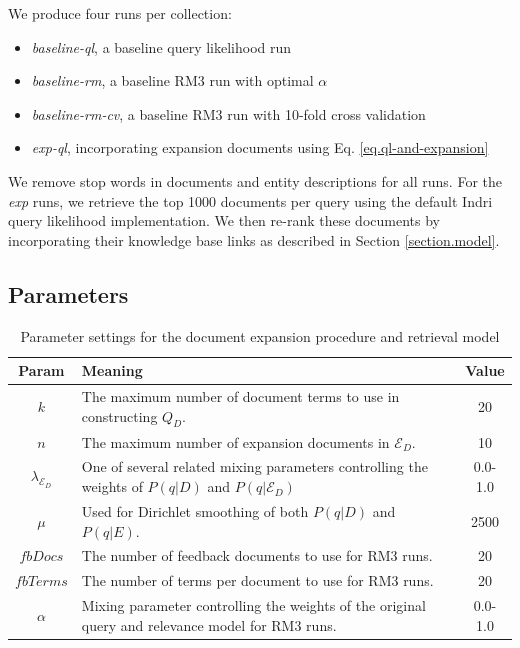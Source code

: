 \documentclass{article}
\begin{document}
We produce four runs per collection:
\begin{itemize}
	\item \textit{baseline-ql}, a baseline query likelihood run
	\item \textit{baseline-rm}, a baseline RM3 run with optimal $\alpha$
	\item \textit{baseline-rm-cv}, a baseline RM3 run with 10-fold cross validation
	\item \textit{exp-ql}, incorporating expansion documents using Eq. \ref{eq.ql-and-expansion}
\end{itemize}

We remove stop words in documents and entity descriptions for all runs. For the \textit{exp} runs, we retrieve the top 1000 documents per query using the default Indri query likelihood implementation. We then re-rank these documents by incorporating their knowledge base links as described in Section \ref{section.model}.

\subsection{Parameters}\label{section.evaluation.parameters}

\begin{table}[htb]
\centering
\begin{tabular}{|c|p{}|c|} \hline
{\bf Param} & {\bf Meaning} & {\bf Value} \\ \hline
$k$ & The maximum number of document terms to use in constructing $Q_D$. & 20 \\ \hline
$n$ & The maximum number of expansion documents in $\mathcal{E}_D$. & 10 \\ \hline
$\lambda_{\mathcal{E}_D}$ & One of several related mixing parameters controlling the weights of $P(q|D)$ and $P(q|\mathcal{E}_D)$ & 0.0-1.0 \\ \hline
$\mu$ & Used for Dirichlet smoothing of both $P(q|D)$ and $P(q|E)$. & 2500 \\ \hline
$fbDocs$ & The number of feedback documents to use for RM3 runs. & 20 \\ \hline
$fbTerms$ & The number of terms per document to use for RM3 runs. & 20 \\ \hline
$\alpha$ & Mixing parameter controlling the weights of the original query and relevance model for RM3 runs. & 0.0-1.0 \\ \hline
\end{tabular}
\caption{Parameter settings for the document expansion procedure and retrieval model}
\label{table.parameters}
\end{table}
\end{document}
